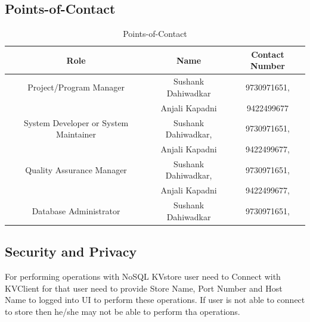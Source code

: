 \subsection{Points-of-Contact}
\begin{table}[h]
\begin{flushleft}
\caption{Points-of-Contact}\label{Points-of-Contact}
\begin{tabular}{|c|c|c|} \hline
Role&	Name&	Contact Number\\ \hline
Project/Program Manager & Sushank Dahiwadkar& 9730971651, \\
& Anjali Kapadni & 9422499677 \\\hline		
System Developer or System Maintainer & Sushank Dahiwadkar, & 9730971651, \\
& Anjali Kapadni & 9422499677, \\ \hline	
Quality Assurance Manager & Sushank Dahiwadkar, & 9730971651, \\
& Anjali Kapadni & 9422499677, \\ \hline	
Database Administrator& Sushank Dahiwadkar& 9730971651, \\ \hline

\end{tabular}
\end{flushleft}
\end{table}

\subsection{Security and Privacy}
\hspace*{0.7in} For performing operations with NoSQL KVstore user need to Connect with KVClient for that user need to provide Store Name, Port Number and Host Name to logged into UI to perform these operations.
If user is not able to connect to store then he/she may not be able to perform tha operations.

